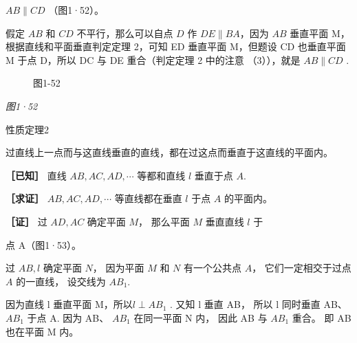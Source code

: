 \(AB \parallel CD\) （图1·52）。

假定 \(AB\) 和 \(CD\) 不平行，那么可以自点 \(D\) 作
\(DE \parallel BA\)，因为 \(AB\) 垂直平面 M，根据直线和平面垂直判定定理
2，可知 ED 垂直平面 M，但题设 CD 也垂直平面 M 于点 D，所以 DC 与 DE
重合（判定定理 2 中的注意 （3）），就是 \(AB \parallel CD\) .

\begin{figure}
\centering
{}
\caption{图1-52}
\end{figure}

\emph{图1·52}

性质定理2

过直线上一点而与这直线垂直的直线，都在过这点而垂直于这直线的平面内。

\textbf{［已知］} 直线 \(AB, AC, AD, \cdots\) 等都和直线 \(l\) 垂直于点
\(A\).

\textbf{［求证］} \(AB, AC, AD, \cdots\) 等直线都在垂直 \(l\) 于点 \(A\)
的平面内。

\textbf{［证］} 过 \(AD, AC\) 确定平面 \(M\)， 那么平面 \(M\) 垂直直线
\(l\) 于

点 A（图1·53）。

过 \(AB, l\) 确定平面 \(N\)， 因为平面 \(M\) 和 \(N\) 有一个公共点
\(A\)， 它们一定相交于过点 \(A\) 的一直线， 设交线为 \(AB_{1}\).

因为直线 l 垂直平面 M，所以\(l \perp AB_{1}\) . 又知 l 垂直 AB， 所以 l
同时垂直 AB、 \(AB_{1}\) 于点 A. 因为 AB、 \(AB_{1}\) 在同一平面 N 内，
因此 AB 与 \(AB_{1}\) 重合。 即 AB 也在平面 M 内。

